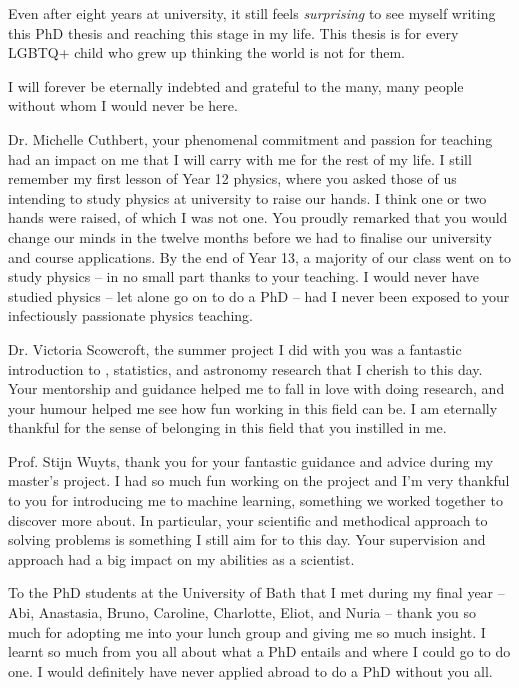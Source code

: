 %
\label{sec:acknowledgement}

Even after eight years at university, it still feels \emph{surprising} to see myself writing this PhD thesis and reaching this stage in my life. This thesis is for every LGBTQ+ child who grew up thinking the world is not for them. %

I will forever be eternally indebted and grateful to the many, many people without whom I would never be here. %

Dr. Michelle Cuthbert, your phenomenal commitment and passion for teaching had an impact on me that I will carry with me for the rest of my life. I still remember my first lesson of Year 12 physics, where you asked those of us intending to study physics at university to raise our hands. I think one or two hands were raised, of which I was not one. You proudly remarked that you would change our minds in the twelve months before we had to finalise our university and course applications. By the end of Year 13, a majority of our class went on to study physics -- in no small part thanks to your teaching. I would never have studied physics -- let alone go on to do a PhD -- had I never been exposed to your infectiously passionate physics teaching.

Dr. Victoria Scowcroft, the summer project I did with you was a fantastic introduction to \gaia, statistics, and astronomy research that I cherish to this day. Your mentorship and guidance helped me to fall in love with doing research, and your humour helped me see how fun working in this field can be. I am eternally thankful for the sense of belonging in this field that you instilled in me.

Prof. Stijn Wuyts, thank you for your fantastic guidance and advice during my master's project. I had so much fun working on the project and I'm very thankful to you for introducing me to machine learning, something we worked together to discover more about. In particular, your scientific and methodical approach to solving problems is something I still aim for to this day. Your supervision and approach had a big impact on my abilities as a scientist.

To the PhD students at the University of Bath that I met during my final year -- Abi, Anastasia, Bruno, Caroline, Charlotte, Eliot, and Nuria -- thank you so much for adopting me into your lunch group and giving me so much insight. I learnt so much from you all about what a PhD entails and where I could go to do one. I would definitely have never applied abroad to do a PhD without you all.

